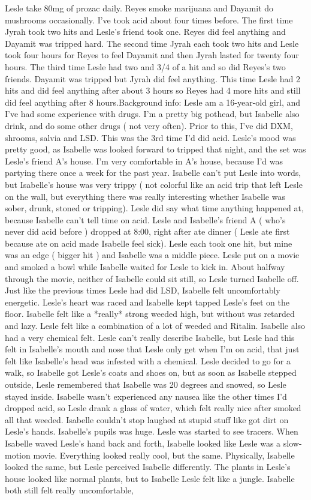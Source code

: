 \documentclass[12pt]{book}
\begin{document}
Lesle take 80mg of prozac daily. Reyes smoke marijuana and Dayamit do mushrooms occasionally. I've took acid about four times before. The first time Jyrah took two hits and Lesle's friend took one. Reyes did feel anything and Dayamit was tripped hard. The second time Jyrah each took two hits and Lesle took four hours for Reyes to feel Dayamit and then Jyrah lasted for twenty four hours. The third time Lesle had two and 3/4 of a hit and so did Reyes's two friends. Dayamit was tripped but Jyrah did feel anything. This time Lesle had 2 hits and did feel anything after about 3 hours so Reyes had 4 more hits and still did feel anything after 8 hours.Background info: Lesle am a 16-year-old girl, and I've had some experience with drugs. I'm a pretty big pothead, but Isabelle also drink, and do some other drugs ( not very often). Prior to this, I've did DXM, shrooms, salvia and LSD. This was the 3rd time I'd did acid. Lesle's mood was pretty good, as Isabelle was looked forward to tripped that night, and the set was Lesle's friend A's house. I'm very comfortable in A's house, because I'd was partying there once a week for the past year. Isabelle can't put Lesle into words, but Isabelle's house was very trippy ( not colorful like an acid trip that left Lesle on the wall, but everything there was really interesting whether Isabelle was sober, drunk, stoned or tripping). Lesle did say what time anything happened at, because Isabelle can't tell time on acid. Lesle and Isabelle's friend A ( who's never did acid before ) dropped at 8:00, right after ate dinner ( Lesle ate first because ate on acid made Isabelle feel sick). Lesle each took one hit, but mine was an edge ( bigger hit ) and Isabelle was a middle piece. Lesle put on a movie and smoked a bowl while Isabelle waited for Lesle to kick in. About halfway through the movie, neither of Isabelle could sit still, so Lesle turned Isabelle off. Just like the previous times Lesle had did LSD, Isabelle felt uncomfortably energetic. Lesle's heart was raced and Isabelle kept tapped Lesle's feet on the floor. Isabelle felt like a *really* strong weeded high, but without was retarded and lazy. Lesle felt like a combination of a lot of weeded and Ritalin. Isabelle also had a very chemical felt. Lesle can't really describe Isabelle, but Lesle had this felt in Isabelle's mouth and nose that Lesle only get when I'm on acid, that just felt like Isabelle's head was infested with a chemical. Lesle decided to go for a walk, so Isabelle got Lesle's coats and shoes on, but as soon as Isabelle stepped outside, Lesle remembered that Isabelle was 20 degrees and snowed, so Lesle stayed inside. Isabelle wasn't experienced any nausea like the other times I'd dropped acid, so Lesle drank a glass of water, which felt really nice after smoked all that weeded. Isabelle couldn't stop laughed at stupid stuff like got dirt on Lesle's hands. Isabelle's pupils was huge. Lesle was started to see tracers. When Isabelle waved Lesle's hand back and forth, Isabelle looked like Lesle was a slow-motion movie. Everything looked really cool, but the same. Physically, Isabelle looked the same, but Lesle perceived Isabelle differently. The plants in Lesle's house looked like normal plants, but to Isabelle Lesle felt like a jungle. Isabelle both still felt really uncomfortable, 
\end{document}
